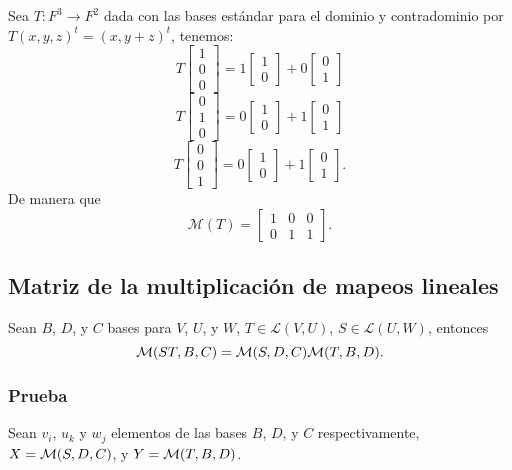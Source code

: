 \documentclass{article}
\begin{document}
Sea $T:F^3\rightarrow F^2$ dada con las bases estándar para el dominio y
contradominio por $T(x,y,z)^t = (x,y + z)^t$, tenemos:
{
$$T\begin{bmatrix}
    1\\
    0\\
    0    
\end{bmatrix}
 = 
 1\begin{bmatrix}
    1\\
    0
 \end{bmatrix}
 +0\begin{bmatrix}
    0\\
    1
 \end{bmatrix}
 $$
 $$T\begin{bmatrix}
    0\\
    1\\
    0
 \end{bmatrix}
 =
 0\begin{bmatrix}
    1\\
    0
 \end{bmatrix}
 +1\begin{bmatrix}
    0\\
    1
 \end{bmatrix}
 $$
 $$
 T\begin{bmatrix}
    0\\
    0\\
    1
 \end{bmatrix}
 =
 0\begin{bmatrix}
    1\\
    0
 \end{bmatrix}
 +
 1\begin{bmatrix}
    0\\
    1
 \end{bmatrix}
 .$$
}
De manera que
$$\mathcal{M}(T) = \begin{bmatrix}
    1 & 0 & 0\\
    0 & 1 & 1
\end{bmatrix}.$$
\newpage

\subsection{Matriz de la multiplicación de mapeos lineales}
Sean $B$, $D$, y $C$ bases para $V$, $U$, y $W$, $T\in\mathcal{L}(V,U)$,
$S\in\mathcal{L}(U,W)$, entonces
$$\mathcal{M}(ST,B,C) = \mathcal{M}(S,D,C)\mathcal{M}(T,B,D).$$
\subsubsection*{Prueba}
Sean $v_i$, $u_k$ y $w_j$ elementos de las bases $B$, $D$, y $C$ respectivamente, $X=\mathcal{M}(S,D,C)$, y $Y=\mathcal{M}(T,B,D)$.
\end{document}
